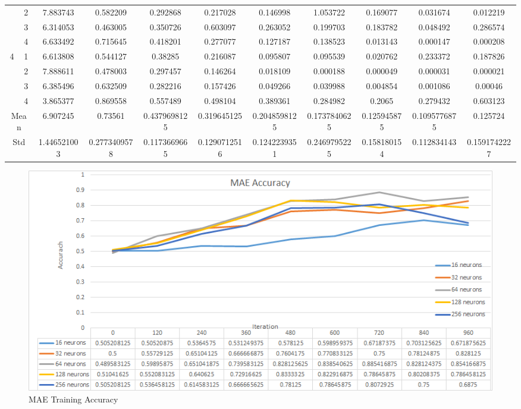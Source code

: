\documentclass[draft,dvipsnames]{drexel-thesis}
\begin{document}
\begin{thesis}
\begin{table}[!t]
{\begin{tabular}{|c|c|c|c|c|c|c|c|c|c|c|}
                      & 2                   & 7.883743    & 0.582209     & 0.292868     & 0.217028     & 0.146998     & 1.053722     & 0.169077    & 0.031674     & 0.012219     \\ \cline{2-11}
                      & 3                   & 6.314053    & 0.463005     & 0.350726     & 0.603097     & 0.263052     & 0.199703     & 0.183782    & 0.048492     & 0.286574     \\ \cline{2-11}
                      & 4                   & 6.633492    & 0.715645     & 0.418201     & 0.277077     & 0.127187     & 0.138523     & 0.013143    & 0.000147     & 0.000208     \\ \hline
\multirow{4}{*}{4}    & 1                   & 6.613808    & 0.544127     & 0.38285      & 0.216087     & 0.095807     & 0.095539     & 0.020762    & 0.233372     & 0.187826     \\ \cline{2-11}
                      & 2                   & 7.888611    & 0.478003     & 0.297457     & 0.146264     & 0.018109     & 0.000188     & 0.000049    & 0.000031     & 0.000021     \\ \cline{2-11}
                      & 3                   & 6.385496    & 0.632509     & 0.282216     & 0.157426     & 0.049266     & 0.039988     & 0.004854    & 0.001086     & 0.00046      \\ \cline{2-11}
                      & 4                   & 3.865377    & 0.869558     & 0.557489     & 0.498104     & 0.389361     & 0.284982     & 0.2065      & 0.279432     & 0.603123     \\ \hline
\multicolumn{2}{|c|}{Mean}                  & 6.907245    & 0.73561      & 0.4379698125 & 0.319645125  & 0.2048598125 & 0.1737840625 & 0.125945875 & 0.1095776875 & 0.125724     \\ \hline
\multicolumn{2}{|c|}{Std}                   & 1.446521003 & 0.2773409578 & 0.1173669665 & 0.1290712516 & 0.1242239351 & 0.2469795225 & 0.158180154 & 0.112834143  & 0.1591742227 \\ \hline
\end{tabular}}
\end{table}


\begin{figure}[t!]
    \centering
    \includegraphics[width=\textwidth]{pictures/result_pictures/MAE_Accuracy.png}
    \caption{MAE Training Accuracy}
    \label{fig:mae_accuracy}
\end{figure}


\end{thesis}
\end{document}
